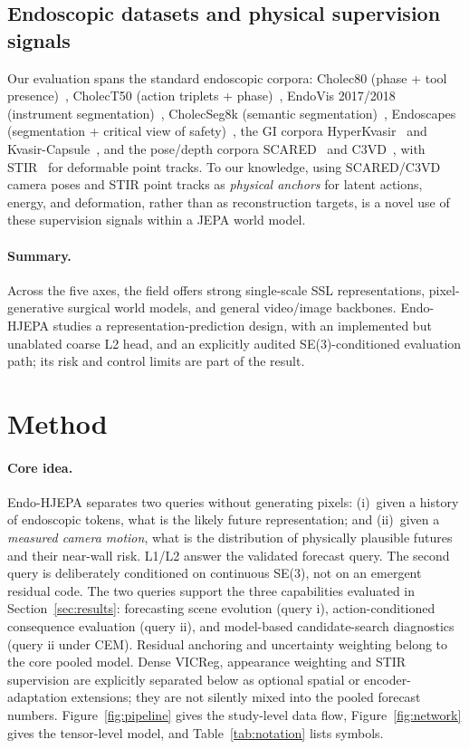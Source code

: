 \documentclass[preprint,12pt]{elsarticle}
\begin{document}
\subsection{Endoscopic datasets and physical supervision signals}
Our evaluation spans the standard endoscopic corpora: Cholec80 (phase + tool presence)~\cite{twinanda2017endonet}, CholecT50 (action triplets + phase)~\cite{nwoye2022rendezvous,nwoye2022cholectsplit}, EndoVis 2017/2018 (instrument segmentation)~\cite{endovis2017}, CholecSeg8k (semantic segmentation)~\cite{hong2020cholecseg8k}, Endoscapes (segmentation + critical view of safety)~\cite{endoscapes}, the GI corpora HyperKvasir~\cite{borgli2020hyperkvasir} and Kvasir-Capsule~\cite{kvasircapsule}, and the pose/depth corpora SCARED~\cite{allan2021scared} and C3VD~\cite{bobrow2023c3vd}, with STIR~\cite{stir2024} for deformable point tracks. To our knowledge, using SCARED/C3VD camera poses and STIR point tracks as \emph{physical anchors} for latent actions, energy, and deformation, rather than as reconstruction targets, is a novel use of these supervision signals within a JEPA world model.

\paragraph{Summary.} Across the five axes, the field offers strong
single-scale SSL representations, pixel-generative surgical world models, and
general video/image backbones. Endo-HJEPA studies a
representation-prediction design, with an implemented but unablated coarse L2
head, and an explicitly audited SE(3)-conditioned evaluation path; its risk
and control limits are part of the result.

\section{Method}
\label{sec:method}

\paragraph{Core idea.}
Endo-HJEPA separates two queries without generating pixels:
(i)~given a history of endoscopic tokens, what is the likely future
representation; and (ii)~given a \emph{measured camera motion}, what is the
distribution of physically plausible futures and their near-wall risk.
L1/L2 answer the validated forecast query. The second query is deliberately
conditioned on continuous SE(3), not on an emergent residual code.
The two queries support the three capabilities evaluated in
Section~\ref{sec:results}: forecasting scene evolution (query i),
action-conditioned consequence evaluation (query ii), and model-based
candidate-search diagnostics (query ii under CEM).
Residual anchoring and uncertainty weighting belong to the core pooled model.
Dense VICReg, appearance weighting and STIR supervision are explicitly
separated below as optional spatial or encoder-adaptation extensions; they are
not silently mixed into the pooled forecast numbers.
Figure~\ref{fig:pipeline} gives the study-level data flow,
Figure~\ref{fig:network} gives the tensor-level model, and
Table~\ref{tab:notation} lists symbols.
\end{document}
